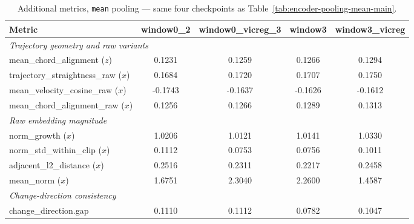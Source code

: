 \begin{table}[H]
\centering
\caption{Additional metrics, \texttt{mean} pooling --- same four checkpoints as
Table~\ref{tab:encoder-pooling-mean-main}.}
\label{tab:encoder-pooling-mean-additional}
\begin{tabular}{lcccc}
\toprule
Metric & window0\_2 & window0\_vicreg\_3 & window3 & window3\_vicreg \\
\midrule
\multicolumn{5}{l}{\textit{Trajectory geometry and raw variants}} \\
mean\_chord\_alignment ($z$) & 0.1231 & 0.1259 & 0.1266 & 0.1294 \\
trajectory\_straightness\_raw ($x$) & 0.1684 & 0.1720 & 0.1707 & 0.1750 \\
mean\_velocity\_cosine\_raw ($x$) & -0.1743 & -0.1637 & -0.1626 & -0.1612 \\
mean\_chord\_alignment\_raw ($x$) & 0.1256 & 0.1266 & 0.1289 & 0.1313 \\
\midrule
\multicolumn{5}{l}{\textit{Raw embedding magnitude}} \\
norm\_growth ($x$) & 1.0206 & 1.0121 & 1.0141 & 1.0330 \\
norm\_std\_within\_clip ($x$) & 0.1112 & 0.0753 & 0.0756 & 0.1011 \\
adjacent\_l2\_distance ($x$) & 0.2516 & 0.2311 & 0.2217 & 0.2458 \\
mean\_norm ($x$) & 1.6751 & 2.3040 & 2.2600 & 1.4587 \\
\midrule
\multicolumn{5}{l}{\textit{Change-direction consistency}} \\
change\_direction.gap & 0.1110 & 0.1112 & 0.0782 & 0.1047 \\
\bottomrule
\end{tabular}
\end{table}

